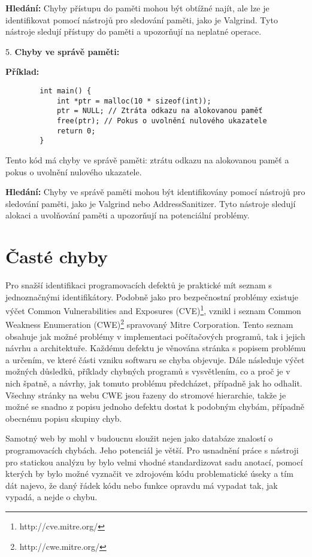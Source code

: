 \documentclass{article}
\begin{document}
	\textbf{Hledání:} Chyby přístupu do paměti mohou být obtížné najít, ale lze je identifikovat pomocí nástrojů pro sledování paměti, jako je Valgrind. Tyto nástroje sledují přístupy do paměti a upozorňují na neplatné operace.
	
	5. \textbf{Chyby ve správě paměti:}
	
	\textbf{Příklad:}
	\begin{verbatim}
		int main() {
			int *ptr = malloc(10 * sizeof(int));
			ptr = NULL; // Ztráta odkazu na alokovanou paměť
			free(ptr); // Pokus o uvolnění nulového ukazatele
			return 0;
		}
	\end{verbatim}
	Tento kód má chyby ve správě paměti: ztrátu odkazu na alokovanou paměť a pokus o uvolnění nulového ukazatele.
	
	\textbf{Hledání:} Chyby ve správě paměti mohou být identifikovány pomocí nástrojů pro sledování paměti, jako je Valgrind nebo AddressSanitizer. Tyto nástroje sledují alokaci a uvolňování paměti a upozorňují na potenciální problémy.
	
\section*{Časté chyby}

Pro snažší identifikaci programovacích defektů je praktické mít seznam s jednoznačnými identifikátory. Podobně jako pro bezpečnostní problémy existuje výčet Common Vulnerabilities and Exposures (CVE)\footnote{http://cve.mitre.org/}, vznikl i seznam Common Weakness Enumeration (CWE)\footnote{http://cwe.mitre.org/} spravovaný Mitre Corporation. Tento seznam obsahuje jak možné problémy v implementaci počítačových programů, tak i jejich návrhu a architektuře. Každému defektu je věnována stránka s popisem problému a určením, ve které části vzniku softwaru se chyba objevuje. Dále následuje výčet možných důsledků, příklady chybných programů s vysvětlením, co a proč je v nich špatně, a návrhy, jak tomuto problému předcházet, případně jak ho odhalit. Všechny stránky na webu CWE jsou řazeny do stromové hierarchie, takže je možné se snadno z popisu jednoho defektu dostat k podobným chybám, případně obecnému popisu skupiny chyb.

Samotný web by mohl v budoucnu sloužit nejen jako databáze znalostí o programovacích chybách. Jeho potenciál je větší. Pro usnadnění práce s nástroji pro statickou analýzu by bylo velmi vhodné standardizovat sadu anotací, pomocí kterých by bylo možné vyznačit ve zdrojovém kódu problematické úseky a tím dát najevo, že daný řádek kódu nebo funkce opravdu má vypadat tak, jak vypadá, a nejde o chybu.
\end{document}
